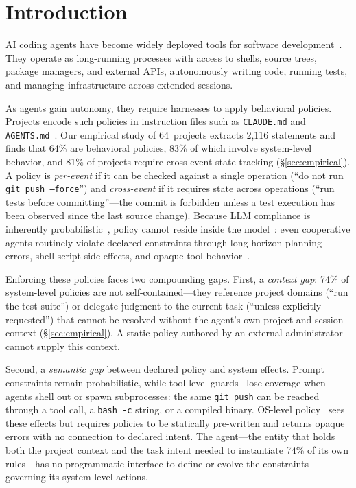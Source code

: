 \section{Introduction}


AI coding agents have become widely deployed tools for software
development~\cite{agentsight}. They operate as long-running processes with
access to shells, source trees, package managers, and external APIs,
autonomously writing code, running tests, and managing infrastructure across
extended sessions.

As agents gain autonomy, they require harnesses to apply behavioral
policies. Projects encode such policies in instruction files such
as \texttt{CLAUDE.md} and
\texttt{AGENTS.md}~\cite{chatlatanagulchai2025manifests,lulla2026agentsmd}.
Our empirical study of 64~projects extracts 2{,}116 statements and finds
that 64\% are behavioral policies, 83\% of which involve system-level
behavior, and 81\% of projects require cross-event state tracking
(\S\ref{sec:empirical}).
A policy is \emph{per-event} if it can be checked against a single
operation (``do not run \texttt{git push --force}'') and
\emph{cross-event} if it requires state across operations (``run tests
before committing''---the commit is forbidden unless a test execution
has been observed since the last source change).
Because LLM compliance is inherently
probabilistic~\cite{liu2024lost}, policy cannot reside inside the
model~\cite{langchain-harness,fowler-harness}: even cooperative agents
routinely violate declared constraints through long-horizon planning
errors, shell-script side effects, and opaque tool
behavior~\cite{jimenez2024swebench}.

Enforcing these policies faces two compounding gaps. First, a
\emph{context gap}: 74\% of system-level policies are not
self-contained---they reference project domains (``run the test suite'')
or delegate judgment to the current task (``unless explicitly
requested'') that cannot be resolved without the agent's own project
and session context (\S\ref{sec:empirical}). A static policy authored
by an external administrator cannot supply this context.

Second, a \emph{semantic gap} between declared policy and system effects.
Prompt constraints remain probabilistic, while tool-level
guards~\cite{wang2025agentspec,shi2025progent} lose coverage when agents
shell out or spawn subprocesses: the same \texttt{git~push} can be reached
through a tool call, a \texttt{bash~-c} string, or a compiled binary.
OS-level policy~\cite{ciliumtetragon,flume,pasquier2018camquery} sees
these effects but requires policies to be statically pre-written and
returns opaque errors with no connection to declared intent.
The agent---the entity that holds both the project context and the
task intent needed to instantiate 74\% of its own rules---has no
programmatic interface to define or evolve the constraints governing
its system-level actions.

